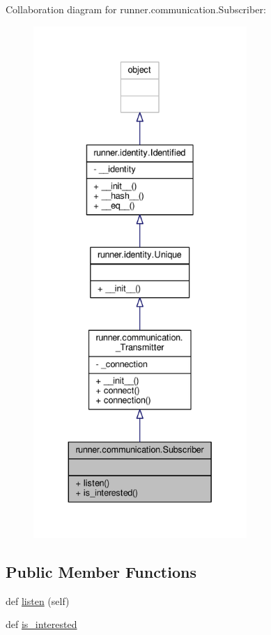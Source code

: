 Collaboration diagram for runner.\+communication.\+Subscriber\+:
\nopagebreak
\begin{figure}[H]
\begin{center}
\leavevmode
\includegraphics[height=550pt]{classrunner_1_1communication_1_1Subscriber__coll__graph}
\end{center}
\end{figure}
\subsection*{Public Member Functions}
\begin{DoxyCompactItemize}
\item 
def \hyperlink{classrunner_1_1communication_1_1Subscriber_a7e63bf085b8658ee6439cfd4629e9988}{listen} (self)
\item 
def \hyperlink{classrunner_1_1communication_1_1Subscriber_a0c8e5ee6703b5bb6ad807d100db40a4f}{is\+\_\+interested}
\end{DoxyCompactItemize}


